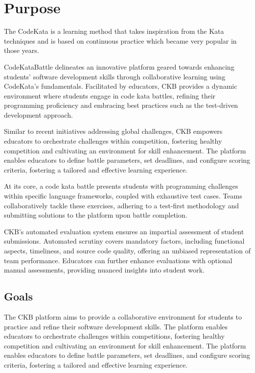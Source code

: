 \renewcommand{\arraystretch}{1.5} %

\section{Purpose}
\label{s:Purpose}%

The CodeKata is a learning method that takes inspiration from the Kata techniques and is based on continuous practice which became very popular in those years.

CodeKataBattle delineates an innovative platform geared towards enhancing students' software development skills through collaborative learning using CodeKata’s fundamentals. Facilitated by educators, CKB provides a dynamic environment where students engage in code kata battles, refining their programming proficiency and embracing best practices such as the test-driven development approach.

Similar to recent initiatives addressing global challenges, CKB empowers educators to orchestrate challenges within competition, fostering healthy competition and cultivating an environment for skill enhancement. The platform enables educators to define battle parameters, set deadlines, and configure scoring criteria, fostering a tailored and effective learning experience.

At its core, a code kata battle presents students with programming challenges within specific language frameworks, coupled with exhaustive test cases. Teams collaboratively tackle these exercises, adhering to a test-first methodology and submitting solutions to the platform upon battle completion.

CKB's automated evaluation system ensures an impartial assessment of student submissions. Automated scrutiny covers mandatory factors, including functional aspects, timeliness, and source code quality, offering an unbiased representation of team performance. Educators can further enhance evaluations with optional manual assessments, providing nuanced insights into student work.

\pagebreak

\subsection{Goals}
\label{ss:goals}%
The CKB platform aims to provide a collaborative environment for students to practice and refine their software development skills. The platform enables educators to orchestrate challenges within competitions, fostering healthy competition and cultivating an environment for skill enhancement. The platform enables educators to define battle parameters, set deadlines, and configure scoring criteria, fostering a tailored and effective learning experience.

